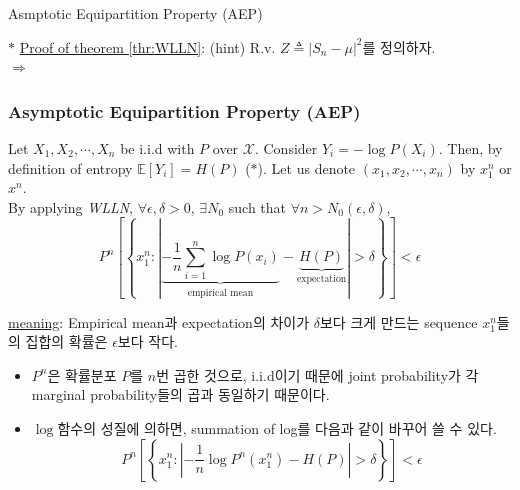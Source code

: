 \documentclass[9pt]{beamer}
\begin{document}
\begin{section}{Asmptotic Equipartition Property (AEP)}
\begin{frame}
            $\ast$ \underline{Proof of theorem \ref{thr:WLLN}}: (hint) R.v. $Z \triangleq |S_n - \mu|^2$를 정의하자.
            \\$\Rightarrow$
            \vspace{2cm}
            
        \end{frame}

        \begin{frame}
            \frametitle{Asymptotic Equipartition Property (AEP)}
            \begin{theorem}\label{thr:AEP}
                Let $X_1, X_2, \cdots, X_n$ be i.i.d with $P$ over $\mathcal X$. Consider $\boxed{Y_i = -\log P(X_i)}$. Then, by definition of entropy $\mathbb E[Y_i] = H(P)$ ($\ast$). Let us denote $(x_1, x_2, \cdots, x_n)$ by $x_1^n$ or $x^n$.
                \\By applying \textit{WLLN}, $\forall \epsilon, \delta > 0$, $\exists N_0$ such that $\forall n > N_0(\epsilon, \delta)$,
                \\$$ P^n\left[\left\{x_1^n:\left|\underbrace{-\frac{1}{n} \sum_{i=1}^n \log P\left(x_i\right)}_{\text{empirical mean}}-\underbrace{H(P)}_{\text{expectation}}\right|>\delta\right\}\right]<\epsilon $$
            \end{theorem}
            \checkmark \underline{meaning}: Empirical mean과 expectation의 차이가 $\delta$보다 크게 만드는 sequence $x_1^n$들의 집합의 확률은 $\epsilon$보다 작다.
            \begin{itemize}
                \item $P^n$은 확률분포 $P$를 $n$번 곱한 것으로, i.i.d이기 때문에 joint probability가 각 marginal probability들의 곱과 동일하기 때문이다.
                \item $\log$함수의 성질에 의하면, summation of log를 다음과 같이 바꾸어 쓸 수 있다.
                $$ P^n\left[\left\{x_1^n:\left|-\frac{1}{n} \log P^n\left(x_1^n\right)-H(P)\right|>\delta\right\}\right]<\epsilon $$
            \end{itemize}
    
        
        \end{frame}


\end{section}
\end{document}
